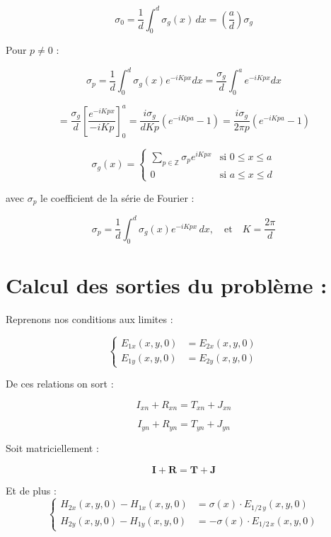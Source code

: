 \documentclass{article}
\begin{document}
\[
\sigma_0 = \frac{1}{d} \int_0^d \sigma_g(x)\, dx = \left( \frac{a}{d} \right) \sigma_g
\]

Pour \( p \neq 0 \) :

\[
\sigma_p = \frac{1}{d} \int_0^d \sigma_g(x) e^{-iKp x} dx 
= \frac{\sigma_g}{d} \int_0^a e^{-iKp x} dx
\]

\[
= \frac{\sigma_g}{d} \left[ \frac{e^{-iKp x}}{-iKp} \right]_0^a 
= \frac{i \sigma_g}{d Kp} \left( e^{-iKp a} - 1 \right) 
= \frac{i \sigma_g}{2\pi p} \left( e^{-iKp a} - 1 \right)
\]

\bigskip

\[
\sigma_g(x) = 
\begin{cases}
\sum\limits_{p \in \mathbb{Z}} \sigma_p e^{iKp x} & \text{si } 0 \leq x \leq a \\
0 & \text{si } a \leq x \leq d
\end{cases}
\]

avec \( \sigma_p \) le coefficient de la série de Fourier :

\[
\sigma_p = \frac{1}{d} \int_0^d \sigma_g(x) e^{-iKp x} \, dx,
\quad \text{et} \quad K = \frac{2\pi}{d}
\]

\bigskip

\section*{Calcul des sorties du problème :}

Reprenons nos conditions aux limites : 

\[
\left\{
\begin{aligned}
E_{1x}(x, y, 0) &= E_{2x}(x, y, 0) \\
E_{1y}(x, y, 0) &= E_{2y}(x, y, 0)
\end{aligned}
\right.
\]

De ces relations on sort : 

\[
I_{xn} + R_{xn} = T_{xn} + J_{xn}
\]

\[
I_{yn} + R_{yn} = T_{yn} + J_{yn}
\]

Soit matriciellement : 

\[
\mathbf{I} + \mathbf{R} = \mathbf{T} + \mathbf{J}
\]


Et de plus : 
\[
\left\{
\begin{aligned}
H_{2x}(x, y, 0) - H_{1x}(x, y, 0) &= \sigma(x) \cdot E_{1/2\,y}(x, y, 0) \\
H_{2y}(x, y, 0) - H_{1y}(x, y, 0) &= -\sigma(x) \cdot E_{1/2\,x}(x, y, 0)
\end{aligned}
\right.
\]
\end{document}
